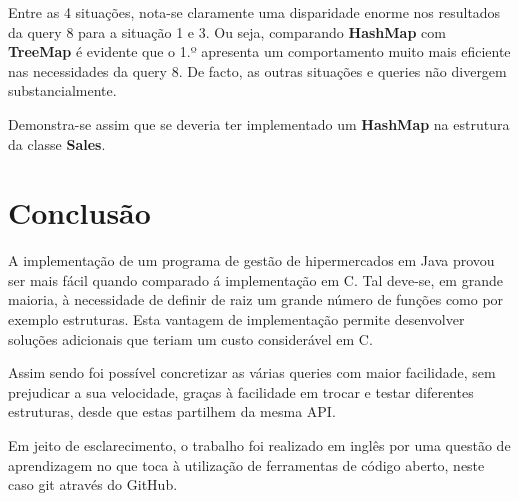\documentclass[10pt] {article}
\begin{document}
\par Entre as 4 situações, nota-se claramente uma disparidade enorme nos resultados da query 8 para a situação 1 e 3.
Ou seja, comparando \color{blue} \textbf{HashMap} \color{black} com \color{blue} \textbf{TreeMap} \color{black} é evidente que
o 1.º apresenta um comportamento muito mais eficiente nas necessidades da query 8.
De facto, as outras situações e queries não divergem substancialmente.

\par Demonstra-se assim que se deveria ter implementado um \color{blue} \textbf{HashMap} \color{black} na estrutura da classe \color{blue}\textbf{Sales}\color{black}.

\newpage

\section{Conclusão}

A implementação de um programa de gestão de hipermercados em Java provou ser mais fácil quando comparado á implementação em C.
Tal deve-se, em grande maioria, à necessidade de definir de raiz um grande número de funções como por exemplo estruturas.
Esta vantagem de implementação permite desenvolver soluções adicionais que teriam um custo considerável em C.

Assim sendo foi possível concretizar as várias queries com maior facilidade, sem prejudicar a sua velocidade, graças à facilidade em trocar e testar diferentes estruturas, desde que estas partilhem da mesma API.

Em jeito de esclarecimento, o trabalho foi realizado em inglês por uma questão de aprendizagem no que toca à utilização de ferramentas de código aberto, neste caso git através do GitHub.
\end{document}
